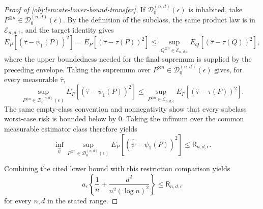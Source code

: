 \begin{proof}[Proof of \cref{obj:lem:ate-lower-bound-transfer}]
If \(\mathcal D_0^{(n,d)}(\epsilon)\) is inhabited, take \(P^{\otimes n}\in\mathcal D_0^{(n,d)}(\epsilon)\).  By the definition of the subclass, the same product law is in \(\mathcal E_{n,d,\epsilon}\), and the target identity gives
\[
E_P\!\left[(\widehat\tau-\psi_1(P))^2\right]
=
E_P\!\left[(\widehat\tau-\tau(P))^2\right]
\le
\sup_{Q^{\otimes n}\in\mathcal E_{n,d,\epsilon}}
E_Q\!\left[(\widehat\tau-\tau(Q))^2\right],
\]
where the upper boundedness needed for the final supremum is supplied by the preceding envelope.  Taking the supremum over \(P^{\otimes n}\in\mathcal D_0^{(n,d)}(\epsilon)\) gives, for every measurable \(\widehat\tau\),
\[
\sup_{P^{\otimes n}\in\mathcal D_0^{(n,d)}(\epsilon)}
E_P\!\left[(\widehat\tau-\psi_1(P))^2\right]
\le
\sup_{P^{\otimes n}\in\mathcal E_{n,d,\epsilon}}
E_P\!\left[(\widehat\tau-\tau(P))^2\right].
\]
The same empty-class convention and nonnegativity show that every subclass worst-case risk is bounded below by \(0\).  Taking the infimum over the common measurable estimator class therefore yields
\[
\inf_{\widehat\psi}
\sup_{P^{\otimes n}\in\mathcal D_0^{(n,d)}(\epsilon)}
E_P\!\left[(\widehat\psi-\psi_1(P))^2\right]
\le
\mathsf R_{n,d,\epsilon}.
\]

Combining the cited lower bound with this restriction comparison yields
\[
a_\epsilon\left\{\frac1n+\frac{d^2}{n^2(\log n)^2}\right\}
\le
\mathsf R_{n,d,\epsilon}
\]
for every \(n,d\) in the stated range.
\end{proof}
